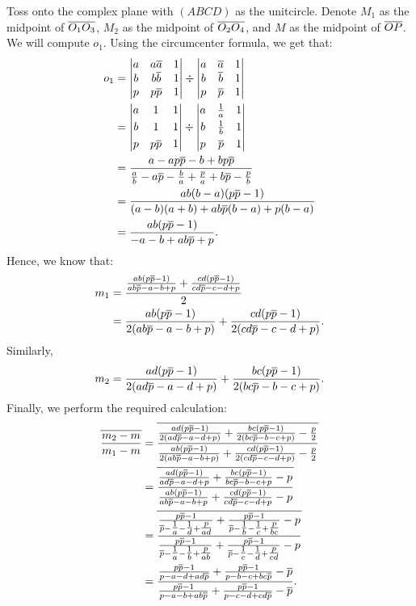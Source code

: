 \documentclass{article}
\begin{document}
Toss onto the complex plane with $(ABCD)$ as the unitcircle. Denote $M_1$ as the midpoint of $\overline{O_1O_3}$, $M_2$ as the midpoint of $\overline{O_2O_4}$, and $M$ as the midpoint of $\overline{OP}$. We will compute $o_1$. Using the circumcenter formula, we get that:
{\allowdisplaybreaks
\begin{align*}
o_1 &= \begin{vmatrix}a&a\overline{a}&1\\b&b\overline{b}&1\\p&p\overline{p}&1\end{vmatrix} \div \begin{vmatrix}a&\overline{a}&1\\b&\overline{b}&1\\p&\overline{p}&1\end{vmatrix} \\
&= \begin{vmatrix}a&1&1\\[3pt]b&1&1\\[3pt]p&p\overline{p}&1\end{vmatrix} \div \begin{vmatrix}a&\tfrac{1}{a}&1\\[3pt]b&\tfrac{1}{b}&1\\[3pt]p&\overline{p}&1\end{vmatrix} \\
&= \dfrac{a-ap\overline{p}-b+bp\overline{p}}{\tfrac{a}{b}-a\overline{p}-\tfrac{b}{a}+\tfrac{p}{a}+b\overline{p}-\tfrac{p}{b}} \\
&= \dfrac{ab(b-a)(p\overline{p}-1)}{(a-b)(a+b)+ab\overline{p}(b-a)+p(b-a)} \\
&= \dfrac{ab(p\overline{p}-1)}{-a-b+ab\overline{p}+p}.
\end{align*}
}
Hence, we know that:
\begin{align*}
m_1 &= \dfrac{\tfrac{ab(p\overline{p}-1)}{ab\overline{p}-a-b+p}+\tfrac{cd(p\overline{p}-1)}{cd\overline{p}-c-d+p}}{2} \\
&= \dfrac{ab(p\overline{p}-1)}{2(ab\overline{p}-a-b+p)}+\dfrac{cd(p\overline{p}-1)}{2(cd\overline{p}-c-d+p)}.
\end{align*}
Similarly, \[m_2 = \dfrac{ad(p\overline{p}-1)}{2(ad\overline{p}-a-d+p)}+\dfrac{bc(p\overline{p}-1)}{2(bc\overline{p}-b-c+p)}.\] Finally, we perform the required calculation:
\begin{align*}
\overline{\dfrac{m_2-m}{m_1-m}} &= \overline{\dfrac{\tfrac{ad(p\overline{p}-1)}{2(ad\overline{p}-a-d+p)}+\tfrac{bc(p\overline{p}-1)}{2(bc\overline{p}-b-c+p)}-\tfrac{p}{2}}{\tfrac{ab(p\overline{p}-1)}{2(ab\overline{p}-a-b+p)}+\tfrac{cd(p\overline{p}-1)}{2(cd\overline{p}-c-d+p)}-\tfrac{p}{2}}} \\
&= \overline{\dfrac{\tfrac{ad(p\overline{p}-1)}{ad\overline{p}-a-d+p}+\tfrac{bc(p\overline{p}-1)}{bc\overline{p}-b-c+p}-p}{\tfrac{ab(p\overline{p}-1)}{ab\overline{p}-a-b+p}+\tfrac{cd(p\overline{p}-1)}{cd\overline{p}-c-d+p}-p}} \\
&= \overline{\dfrac{\tfrac{p\overline{p}-1}{\overline{p}-\tfrac{1}{a}-\tfrac{1}{d}+\tfrac{p}{ad}}+\tfrac{p\overline{p}-1}{\overline{p}-\tfrac{1}{b}-\tfrac{1}{c}+\tfrac{p}{bc}}-p}{\tfrac{p\overline{p}-1}{\overline{p}-\tfrac{1}{a}-\tfrac{1}{b}+\tfrac{p}{ab}}+\tfrac{p\overline{p}-1}{\overline{p}-\tfrac{1}{c}-\tfrac{1}{d}+\tfrac{p}{cd}}-p}} \\
&= \dfrac{\tfrac{p\overline{p}-1}{p-a-d+ad\overline{p}}+\tfrac{p\overline{p}-1}{p-b-c+bc\overline{p}}-\overline{p}}{\tfrac{p\overline{p}-1}{p-a-b+ab\overline{p}}+\tfrac{p\overline{p}-1}{p-c-d+cd\overline{p}}-\overline{p}}.
\end{align*}
\end{document}
